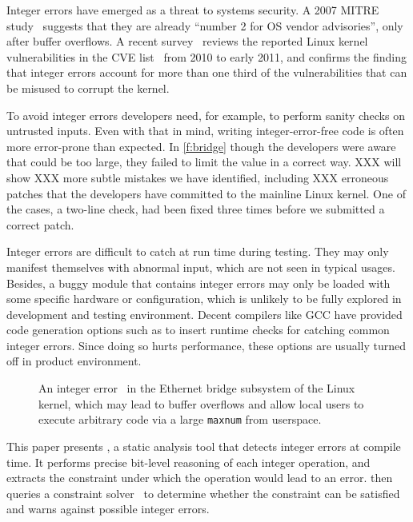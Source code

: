 Integer errors have emerged as a threat to systems security.  A
2007 MITRE study~\cite{christey:vuln} suggests that they are already
``number 2 for OS vendor advisories'', only after buffer overflows.
A recent survey~\cite{chen:kbugs} reviews the reported Linux kernel
vulnerabilities in the CVE list~\cite{cve} from 2010 to early 2011,
and confirms the finding that integer errors account for more than
one third of the vulnerabilities that can be misused to corrupt the
kernel.

To avoid integer errors developers need, for example, to perform
sanity checks on untrusted inputs.  Even with that in mind, writing
integer-error-free code is often more error-prone than expected.
In \autoref{f:bridge} though the developers were aware that 
could be too large, they failed to limit the value in a correct
way.  XXX will show XXX more subtle mistakes we have identified,
including XXX erroneous patches that the developers have committed
to the mainline Linux kernel.  One of the cases, a two-line check,
had been fixed three times before we submitted a correct patch.

Integer errors are difficult to catch at run time during testing.
They may only manifest themselves with abnormal input, which are
not seen in typical usages.  Besides, a buggy module that contains
integer errors may only be loaded with some specific hardware or
configuration, which is unlikely to be fully explored in development
and testing environment.  Decent compilers like GCC have provided
code generation options such as  to insert runtime
checks for catching common integer errors.  Since doing so hurts
performance, these options are usually turned off in product
environment.

\begin{figure}

\caption{An integer error~\cite[CVE-2006-5751]{cve} in the Ethernet
bridge subsystem of the Linux kernel, which may lead to buffer
overflows and allow local users to execute arbitrary code via a
large \texttt{maxnum} from userspace.}
\label{f:bridge}
\end{figure}

This paper presents \sys, a static analysis tool that detects integer
errors at compile time.  It performs precise bit-level reasoning
of each integer operation, and extracts the constraint under which
the operation would lead to an error.  \sys then queries a constraint
solver~\cite{boolector} to determine whether the constraint can be
satisfied and warns against possible integer errors.

